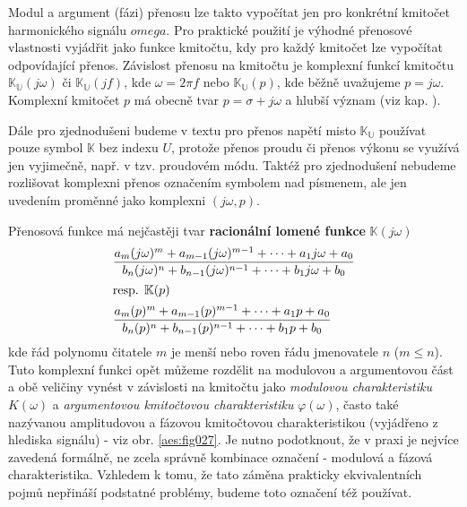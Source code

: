       Modul a argument (fázi) přenosu lze takto vypočítat jen pro konkrétní kmitočet harmonického
      signálu \(omega\). Pro praktické použití je výhodné přenosové vlastnosti vyjádřit jako funkce
      kmitočtu, kdy pro každý kmitočet lze vypočítat odpovídající přenos. Závislost přenosu na
      kmitočtu je komplexní funkcí kmitočtu \(\mathbb{K_U}(j\omega)\) či \(\mathbb{K_U}(jf)\), kde
      \(\omega = 2\pi f\) nebo \(\mathbb{K_U}(p)\), kde běžně uvažujeme \(p = j\omega\). Komplexní
      kmitočet \(p\) má obecně tvar \(p = \sigma + j\omega\) a hlubší význam (viz kap.
      ).
      
      \begin{tcnote}  
        Dále pro zjednodušeni budeme v textu pro přenos napětí misto \(\mathbb{K_U}\) používat pouze
        symbol \(\mathbb{K}\) bez indexu \(U\), protože přenos proudu či přenos výkonu se využívá
        jen vyjimečně, např. v tzv. proudovém módu. Taktéž pro zjednodušení nebudeme rozlišovat
        komplexni přenos označením symbolem nad písmenem, ale jen uvedením proměnné jako komplexni
        \((j\omega, p)\). 
      \end{tcnote}

      Přenosová funkce má nejčastěji tvar \textbf{racionální lomené funkce} \(\mathbb{K}(j\omega)\) 
      \begin{subequations}
        \begin{align}          
            &\frac{a_m(j\omega)^m + a_{m-1}(j\omega)^{m-1} + \cdots + a_1j\omega +a_0}
                  {b_n(j\omega)^n + b_{n-1}(j\omega)^{n-1} + \cdots + b_1j\omega +b_0}  
                  \label{aes:eq027a}                                                        \\
          \shortintertext{resp. \(\mathbb{K}(p)\)} 
            &\frac{a_m(p)^m + a_{m-1}(p)^{m-1} + \cdots + a_1p +a_0}
                  {b_n(p)^n + b_{n-1}(p)^{n-1} + \cdots + b_1p +b_0} 
                  \label{aes:eq027b}
        \end{align}
      \end{subequations}      
      kde řád polynomu čitatele \(m\) je menší nebo roven řádu jmenovatele \(n\) (\(m \leq n\)).
      Tuto komplexní funkci opět můžeme rozdělit na modulovou a argumentovou část a obě veličiny
      vynést v závislosti na kmitočtu jako \emph{modulovou charakteristiku} \(K(\omega)\) a
      \emph{argumentovou kmitočtovou charakteristiku} \(\varphi(\omega)\), často také nazývanou
      amplitudovou a fázovou kmitočtovou charakteristikou (vyjádřeno z hlediska signálu) - viz obr.
      \ref{aes:fig027}. Je nutno podotknout, že v praxi je nejvíce zavedená formálně, ne zcela
      správně kombinace označení - modulová a fázová charakteristika. Vzhledem k tomu, že tato
      záměna prakticky ekvivalentních pojmů nepřináší podstatné problémy, budeme toto označení též
      používat.
      
